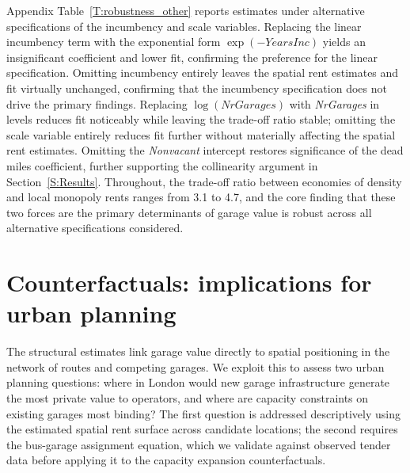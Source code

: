 \documentclass[12pt]{article}
\begin{document}
Appendix Table~\ref{T:robustness_other} reports estimates under alternative 
specifications of the incumbency and scale variables. Replacing the linear 
incumbency term with the exponential form $\exp(-\textit{YearsInc})$ yields 
an insignificant coefficient and lower fit, confirming the preference for 
the linear specification. Omitting incumbency entirely leaves the spatial 
rent estimates and fit virtually unchanged, confirming that the incumbency 
specification does not drive the primary findings. Replacing 
$\log(\textit{NrGarages})$ with \textit{NrGarages} in levels reduces fit 
noticeably while leaving the trade-off ratio stable; omitting the scale 
variable entirely reduces fit further without materially affecting the 
spatial rent estimates. Omitting the \textit{Nonvacant} intercept restores 
significance of the dead miles coefficient, further supporting the 
collinearity argument in Section~\ref{S:Results}. Throughout, the 
trade-off ratio between economies of density and local monopoly rents 
ranges from 3.1 to 4.7, and the core finding that these two forces are 
the primary determinants of garage value is robust across all alternative 
specifications considered.


\section{Counterfactuals: implications for urban planning}\label{S:Counterfactuals}
The structural estimates link garage value directly to spatial positioning 
in the network of routes and competing garages. We exploit this to assess 
two urban planning questions: where in London would new garage infrastructure 
generate the most private value to operators, and where are capacity constraints on existing 
garages most binding? The first question is addressed descriptively using 
the estimated spatial rent surface across candidate locations; the second 
requires the bus-garage assignment equation, which we validate against 
observed tender data before applying it to the capacity expansion 
counterfactuals. 
\end{document}
